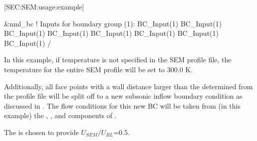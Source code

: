 
[SEC:SEM:usage:example]
 
\begin{nmldescitem}
&nml_bc
  ! Inputs for boundary group (1):
  BC_Input(1)%
  BC_Input(1)%
  BC_Input(1)%
  BC_Input(1)%
  BC_Input(1)%
  BC_Input(1)%
  BC_Input(1)%
  BC_Input(1)%
/
\end{nmldescitem}

In this example, if temperature is not specified in the SEM profile file, the
temperature for the entire SEM profile will be set to 300.0 K.


Additionally, all face points with a wall distance larger than the \hSEM{}
determined from the profile file will be split off to a new subsonic inflow
boundary condition as discussed in .
%
The flow conditions for this new BC will be taken from (in this example) the
, , and  components of
.

The  is chosen to provide
$U_{SEM}/U_{BL}$=0.5.




